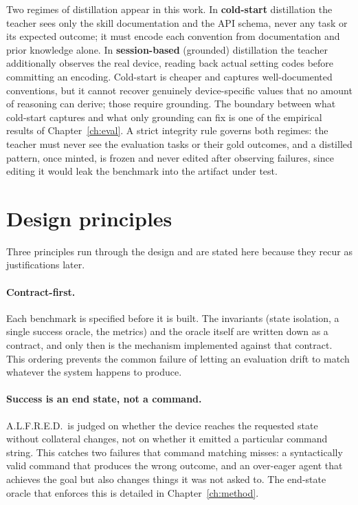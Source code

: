 Two regimes of distillation appear in this work. In \textbf{cold-start}
distillation the teacher sees only the skill documentation and the API schema,
never any task or its expected outcome; it must encode each convention from
documentation and prior knowledge alone. In \textbf{session-based} (grounded)
distillation the teacher additionally observes the real device, reading back
actual setting codes before committing an encoding. Cold-start is cheaper and
captures well-documented conventions, but it cannot recover genuinely
device-specific values that no amount of reasoning can derive; those require
grounding. The boundary between what cold-start captures and what only grounding
can fix is one of the empirical results of Chapter~\ref{ch:eval}. A strict
integrity rule governs both regimes: the teacher must never see the evaluation
tasks or their gold outcomes, and a distilled pattern, once minted, is frozen
and never edited after observing failures, since editing it would leak the benchmark
into the artifact under test.

\section{Design principles}
\label{sec:principles}

Three principles run through the design and are stated here because they recur as
justifications later.

\paragraph{Contract-first.} Each benchmark is specified before it is built. The
invariants (state isolation, a single success oracle, the metrics) and the
oracle itself are written down as a contract, and only then is the mechanism
implemented against that contract. This ordering prevents the common failure of
letting an evaluation drift to match whatever the system happens to produce.

\paragraph{Success is an end state, not a command.} A.L.F.R.E.D.\ is judged on
whether the device reaches the requested state without collateral changes, not on
whether it emitted a particular command string. This catches two failures that
command matching misses: a syntactically valid command that produces the wrong
outcome, and an over-eager agent that achieves the goal but also changes things
it was not asked to. The end-state oracle that enforces this is detailed in
Chapter~\ref{ch:method}.


